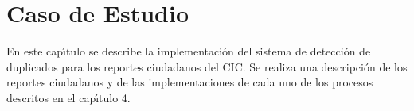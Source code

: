 \chapter{Caso de Estudio}
\label{casoDeEstudio}



En este cap\'{\i}tulo se describe la implementaci\'{o}n del sistema de detecci\'{o}n de duplicados para los reportes ciudadanos del CIC. Se realiza una descripci\'{o}n de los reportes ciudadanos y de las implementaciones de cada uno de los procesos descritos en el cap\'{\i}tulo 4.






\clearpage
